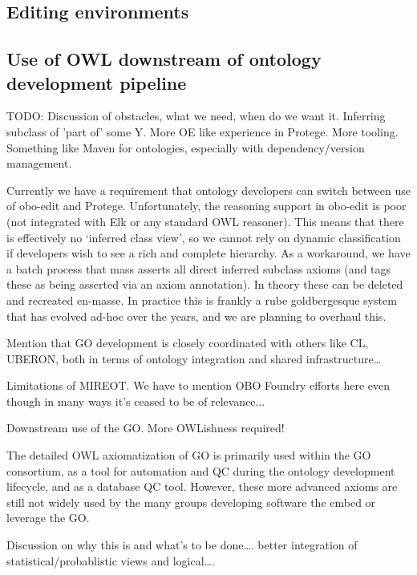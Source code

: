 \documentclass{llncs}
\begin{document}
\subsection{Editing environments}

\subsection{Use of OWL downstream of ontology development pipeline}


TODO: Discussion of obstacles, what we need, when do we want it. Inferring
subclass of 'part of' some Y. More OE like experience in Protege. More
tooling. Something like Maven for ontologies, especially with
dependency/version management.

Currently we have a requirement that ontology developers can switch between use of obo-edit and Protege. Unfortunately, the reasoning support in obo-edit is poor (not integrated with Elk or any standard OWL reasoner). This means that there is effectively no ‘inferred class view’, so we cannot rely on dynamic classification if developers wish to see a rich and complete hierarchy. As a workaround, we have a batch process that mass asserts all direct inferred subclass axioms (and tags these as being asserted via an axiom annotation). In theory these can be deleted and recreated en-masse. In practice this is frankly a rube goldbergesque system that has evolved ad-hoc over the years, and we are planning to overhaul this.

Mention that GO development is closely coordinated with others like CL, UBERON, both in terms of ontology integration and shared infrastructure…

Limitations of MIREOT. We have to mention OBO Foundry efforts here even though in many ways it’s ceased to be of relevance...

Downstream use of the GO. More OWLishness required!

The detailed OWL axiomatization of GO is primarily used within the GO consortium, as a tool for automation and QC during the ontology development lifecycle, and as a database QC tool. However, these more advanced axioms are still not widely used by the many groups developing software the embed or leverage the GO.

Discussion on why this is and what’s to be done…. better integration of statistical/probablistic views and logical….
\end{document}
